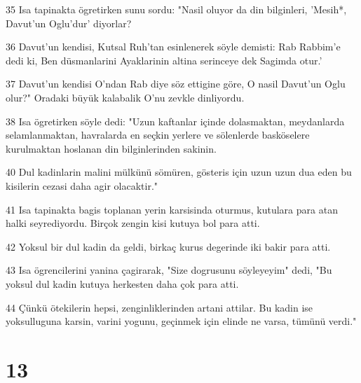 \par 35 Isa tapinakta ögretirken sunu sordu: "Nasil oluyor da din bilginleri, 'Mesih*, Davut'un Oglu'dur' diyorlar?
\par 36 Davut'un kendisi, Kutsal Ruh'tan esinlenerek söyle demisti: Rab Rabbim'e dedi ki, Ben düsmanlarini Ayaklarinin altina serinceye dek Sagimda otur.'
\par 37 Davut'un kendisi O'ndan Rab diye söz ettigine göre, O nasil Davut'un Oglu olur?" Oradaki büyük kalabalik O'nu zevkle dinliyordu.
\par 38 Isa ögretirken söyle dedi: "Uzun kaftanlar içinde dolasmaktan, meydanlarda selamlanmaktan, havralarda en seçkin yerlere ve sölenlerde basköselere kurulmaktan hoslanan din bilginlerinden sakinin.
\par 40 Dul kadinlarin malini mülkünü sömüren, gösteris için uzun uzun dua eden bu kisilerin cezasi daha agir olacaktir."
\par 41 Isa tapinakta bagis toplanan yerin karsisinda oturmus, kutulara para atan halki seyrediyordu. Birçok zengin kisi kutuya bol para atti.
\par 42 Yoksul bir dul kadin da geldi, birkaç kurus degerinde iki bakir para atti.
\par 43 Isa ögrencilerini yanina çagirarak, "Size dogrusunu söyleyeyim" dedi, "Bu yoksul dul kadin kutuya herkesten daha çok para atti.
\par 44 Çünkü ötekilerin hepsi, zenginliklerinden artani attilar. Bu kadin ise yoksulluguna karsin, varini yogunu, geçinmek için elinde ne varsa, tümünü verdi."

\chapter{13}

